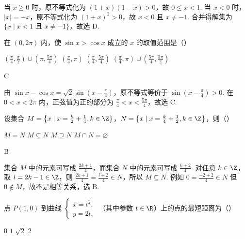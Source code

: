 \begin{solution}
当 \(x\geqslant0\) 时，原不等式化为 \((1+x)(1-x)>0\)，故 \(0\leqslant x<1\). 当 \(x<0\) 时，\(|x|=-x\)，原不等式化为 \((1+x)^2>0\)，故 \(x<0\) 且 \(x\neq-1\). 合并得解集为 \(\{x\mid x<1\text{ 且 }x\neq-1\}\)，故选 D.
\end{solution}

\begin{problem}
在 \((0,2\pi)\) 内，使 \(\sin x > \cos x\) 成立的 \(x\) 的取值范围是（\quad）

\choices
    {\(\left(\frac{\pi}{4},\frac{\pi}{2}\right)\cup \left(\pi,\frac{5\pi}{4}\right)\)}
    {\(\left(\frac{\pi}{4},\pi\right)\)}
    {\(\left(\frac{\pi}{4},\frac{5\pi}{4}\right)\)}
    {\(\left(\frac{\pi}{4}, \pi\right) \cup \left(\frac{5\pi}{4}, \frac{3\pi}{2}\right)\)}
\end{problem}

\begin{answer}
C
\end{answer}

\begin{solution}
由 \(\sin x-\cos x=\sqrt{2}\sin\left(x-\frac{\pi}{4}\right)\)，原不等式等价于 \(\sin\left(x-\frac{\pi}{4}\right)>0\). 在 \(0<x<2\pi\) 内，正弦值为正的部分为 \(\frac{\pi}{4}<x<\frac{5\pi}{4}\)，故选 C.
\end{solution}

\begin{problem}
设集合 \(M = \left\{x \mid x = \frac{k}{2} + \frac{1}{4}, k \in \Z\right\}\)，\(N = \left\{x \mid x = \frac{k}{4} + \frac{1}{2}, k \in \Z\right\}\)，则（\quad）

\choices
    {\(M = N\)}
    {\(M \subseteq N\)}
    {\(M \supseteq N\)}
    {\(M \cap N = \varnothing\)}
\end{problem}

\begin{answer}
B
\end{answer}

\begin{solution}
集合 \(M\) 中的元素可写成 \(\displaystyle\frac{2k+1}{4}\)，而集合 \(N\) 中的元素可写成 \(\displaystyle\frac{k+2}{4}\). 对任意 \(k\in\Z\)，取 \(l=2k-1\in\Z\)，则 \(\displaystyle\frac{2k+1}{4}=\frac{l+2}{4}\in N\)，所以 \(M\subseteq N\). 例如 \(0=\frac{-2+2}{4}\in N\) 但 \(0\notin M\)，故不是相等关系，选 B.
\end{solution}

\begin{problem}
点 \(P(1,0)\) 到曲线 \(\begin{cases}
x = t^2,\\
y = 2t,
\end{cases}\) （其中参数 \(t \in \R\)）上的点的最短距离为（\quad）

\choices
    {\(0\)}
    {\(1\)}
    {\(\sqrt{2}\)}
    {\(2\)}
\end{problem}

